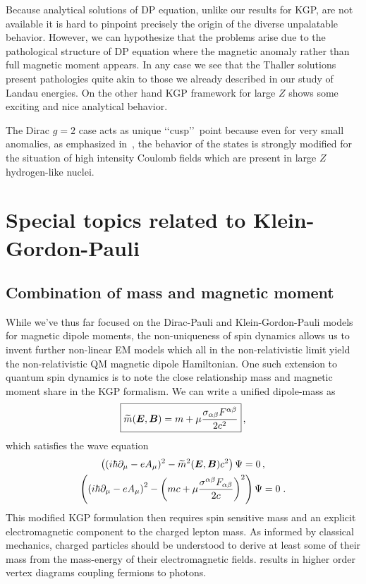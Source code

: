 Because analytical solutions of DP equation, unlike our results for KGP, are not available it is hard to pinpoint precisely the origin of the diverse unpalatable behavior. However, we can hypothesize that the problems arise due to the pathological structure of DP equation where the magnetic anomaly rather than full magnetic moment appears. In any case we see that the Thaller solutions present pathologies quite akin to those we already described in our study of Landau energies. On the other hand KGP framework for large $Z$ shows some exciting and nice analytical behavior.

The Dirac $g\!=\!2$ case acts as unique \lq\lq cusp\rq\rq\ point because even for very small anomalies, as emphasized in~, the behavior of the states is strongly modified for the situation of high intensity Coulomb fields which are present in large $Z$ hydrogen-like nuclei.

\section{Special topics related to Klein-Gordon-Pauli}
\label{sec:kgptopics}
\subsection{Combination of mass and magnetic moment}
\label{sec:ikgp}
While we've thus far focused on the Dirac-Pauli and Klein-Gordon-Pauli models for magnetic dipole moments, the non-uniqueness of spin dynamics allows us to invent further non-linear EM models which all in the non-relativistic limit yield the non-relativistic QM magnetic dipole Hamiltonian. One such extension to quantum spin dynamics is to note the close relationship mass and magnetic moment share in the KGP formalism. We can write a unified dipole-mass as
\begin{alignat}{1}
    \label{eq:ext:01} \boxed{\widetilde{m}(\boldsymbol{E},\boldsymbol{B}) = m +\mu\frac{\sigma_{\alpha\beta}F^{\alpha\beta}}{2c^{2}}}\,,
\end{alignat}
which satisfies the wave equation
\begin{gather}
\label{eq:ext:02} \left((i\hbar\partial_{\mu}-eA_{\mu})^{2}-\widetilde{m}^{2}(\boldsymbol{E},\boldsymbol{B})c^{2}\right)\Psi=0\,,\\
\label{IKGP01} \left(\left(i\hbar\partial_{\mu}-eA_{\mu}\right)^{2}-\left(mc+\mu\frac{\sigma^{\alpha\beta}F_{\alpha\beta}}{2c}\right)^{2}\right)\Psi=0\;.
\end{gather}
This modified KGP formulation then requires spin sensitive mass and an explicit electromagnetic component to the charged lepton mass. As informed by classical mechanics, charged particles should be understood to derive at least some of their mass from the mass-energy of their electromagnetic fields.  results in higher order vertex diagrams coupling fermions to photons.

